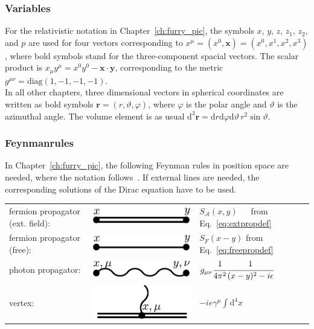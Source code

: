\subsubsection*{Variables}
For the relativistic notation in Chapter~\ref{ch:furry_pic}, the symbols $x$, $y$, $z$, $z_1$, $z_2$, and $p$ are used for four vectors corresponding to $x^\mu=(x^0,\mathbf{x})=(x^0,x^1,x^2,x^3)$, where bold symbols stand for the three-component spacial vectors. The scalar product is $x_\mu y^\mu = x^0 y^0 - \mathbf{x}\cdot\mathbf{y}$, corresponding to the metric $g^{\mu\nu}=\text{diag}(1,-1,-1,-1)$.\\
In all other chapters, three dimensional vectors in spherical coordinates are written as bold symbols $\mathbf{r}=(r,\vartheta,\varphi)$, where $\varphi$ is the polar angle and $\vartheta$ is the azimuthal angle. The volume element is as usual $\text{d}^3\mathbf{r}=\text{d}r\text{d}\varphi\text{d}\vartheta\, r^2 \sin\vartheta $.
\subsubsection*{Feynmanrules}
In Chapter~\ref{ch:furry_pic}, the following Feynman rules in position space are needed, where the notation follows~\cite{itzykson2005}. If external lines are needed, the corresponding solutions of the Dirac equation have to be used.\\

\begin{tabular}{lll}
fermion propagator (ext. field):&\includegraphics[width=0.2\linewidth]{pics/feynrule_1.pdf} & $S_{\mathcal{A}}(x,y)\phantom{-}$ from Eq.~\eqref{eq:extpropdef}\\[7pt]
fermion propagator (free):&\includegraphics[width=0.2\linewidth]{pics/feynrule_2.pdf} &$S_{F}(x-y)$ from Eq.~\eqref{eq:freepropdef}\\[7pt]
photon propagator:&\includegraphics[width=0.2\linewidth]{pics/feynrule_3.pdf} &$g_{\mu\nu}\cfrac{1}{4\pi^2}\cfrac{1}{(x-y)^2-i\epsilon}$\\[7pt]
vertex:&\includegraphics[width=0.2\linewidth]{pics/feynrule_4.pdf} &$-ie\gamma^\mu\int\text{d}^4x$
\end{tabular}
